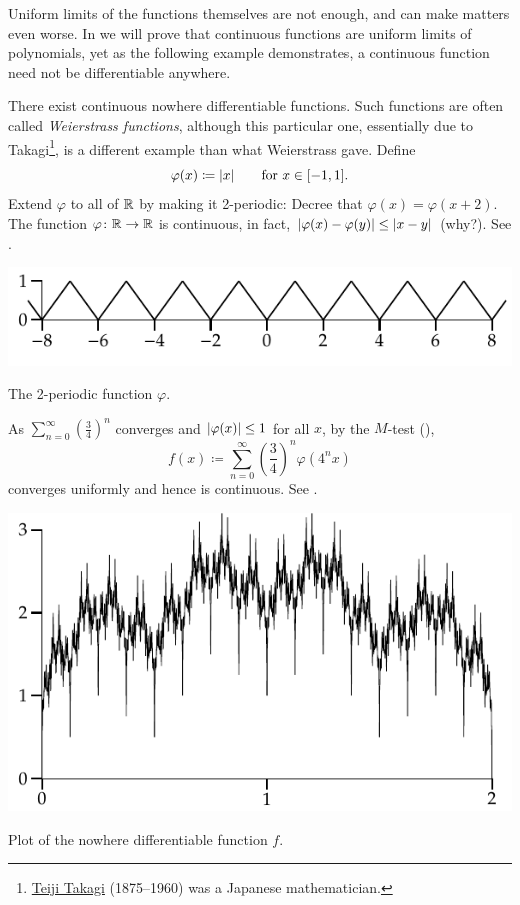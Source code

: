 Uniform limits of the functions themselves are not enough, and can make
matters even worse.  In  we will prove that
continuous functions are uniform limits of polynomials, yet as the following
example demonstrates, a continuous function need not be differentiable
anywhere.

\begin{example}
There exist continuous nowhere differentiable functions.
Such functions are often called
\emph{Weierstrass functions},
although this
particular one, essentially due to
Takagi\footnote{\href{https://en.wikipedia.org/wiki/Teiji_Takagi}{Teiji
Takagi} (1875--1960) was a Japanese mathematician.}, is a different example than what Weierstrass gave.
Define
\begin{equation*}
\varphi(x) \coloneqq \lvert {x} \rvert \qquad \text{for } x \in [-1,1] .
\end{equation*}
Extend $\varphi$ to all of ${\mathbb{R}}$ by making it
2-periodic:
Decree that
$\varphi(x) = \varphi(x+2)$.  The function $\varphi \colon {\mathbb{R}} \to {\mathbb{R}}$
is continuous, in fact, $\lvert {\varphi(x)-\varphi(y)} \rvert \leq \lvert {x-y} \rvert$ (why?).
See .
\begin{myfigureht}
\includegraphics{figures/triangwave}
\caption{The 2-periodic function $\varphi$.\label{fig:triangwave}}
\end{myfigureht}

As $\sum_{n=0}^\infty {\left(\frac{3}{4}\right)}^n$ converges and $\lvert {\varphi(x)} \rvert \leq
1$ for all $x$, by the $M$-test
(),
\begin{equation*}
f(x) \coloneqq \sum_{n=0}^\infty 
{\left(\frac{3}{4}\right)}^n \varphi(4^n x)
\end{equation*}
converges uniformly and hence is continuous.
See .

\begin{myfigureht}
\includegraphics{figures/nowherediff}
\caption{Plot of the nowhere differentiable function $f$.\label{fig:nowherediff}}
\end{myfigureht}


\end{example}
